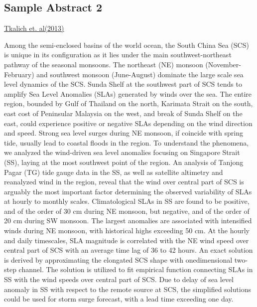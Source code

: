 \documentclass[12pt]{article}
\begin{document}
\subsection*{Sample Abstract 2}
    \href{https://dspace.mit.edu/handle/1721.1/106471}{Tkalich et. al(2013)}
    \begin{paragraph}
        \noindent Among the semi-enclosed basins of the world ocean, the South China Sea (SCS) is unique in its configuration
        as it lies under the main southwest-northeast pathway of the seasonal monsoons. The northeast (NE) monsoon
        (November-February) and southwest monsoon (June-August) dominate the large scale sea level dynamics of
        the SCS. Sunda Shelf at the southwest part of SCS tends to amplify Sea Level Anomalies (SLAs) generated
        by winds over the sea. The entire region, bounded by Gulf of Thailand on the north, Karimata Strait on the
        south, east cost of Peninsular Malaysia on the west, and break of Sunda Shelf on the east, could experience
        positive or negative SLAs depending on the wind direction and speed. Strong sea level surges during NE
        monsoon, if coincide with spring tide, usually lead to coastal floods in the region. To understand the
        phenomena, we analyzed the wind-driven sea level anomalies focusing on Singapore Strait (SS), laying at the
        most southwest point of the region. An analysis of Tanjong Pagar (TG) tide gauge data in the SS, as well as
        satellite altimetry and reanalyzed wind in the region, reveal that the wind over central part of SCS is arguably
        the most important factor determining the observed variability of SLAs at hourly to monthly scales.
        Climatological SLAs in SS are found to be positive, and of the order of 30 cm during NE monsoon, but
        negative, and of the order of 20 cm during SW monsoon. The largest anomalies are associated with
        intensified winds during NE monsoon, with historical highs exceeding 50 cm. At the hourly and daily timescales, SLA magnitude is correlated with the NE wind speed over central part of SCS with an average time lag
        of 36 to 42 hours. An exact solution is derived by approximating the elongated SCS shape with onedimensional two-step channel. The solution is utilized to fit empirical function connecting SLAs in SS with
        the wind speeds over central part of SCS. Due to delay of sea level anomaly in SS with respect to the remote
        source at SCS, the simplified solutions could be used for storm surge forecast, with a lead time exceeding one
        day. 
    \end{paragraph}
\end{document}
